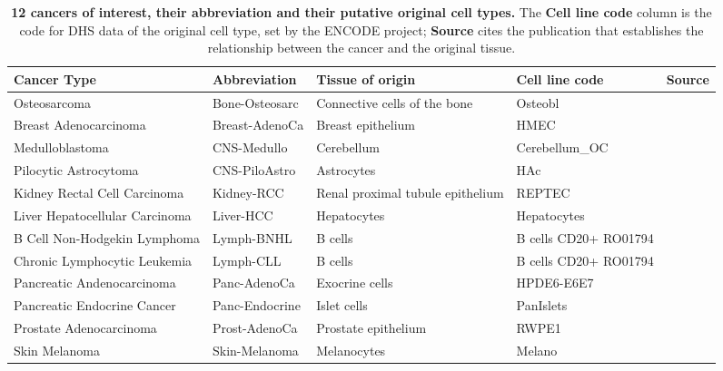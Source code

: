 \begin{table}[hp!]
\centering
\caption{\textbf{12 cancers of interest, their abbreviation and their putative original cell types.} The \textbf{Cell line code} column is the code for DHS data of the original cell type, set by the ENCODE project; \textbf{Source} cites the publication that establishes the relationship between the cancer and the original tissue.}
\label{tab:encode}
\begin{tabulary}{\textwidth}{ LlLLR }
\toprule
\bf{Cancer Type} & \bf{Abbreviation} & \bf{Tissue of origin} & \textbf{Cell line code} & \bf{Source} \\
\toprule
Osteosarcoma & Bone-Osteosarc & Connective cells of the bone & Osteobl & \citet{Alfranca2015BoneDevelopment} \\ \hline

Breast Adenocarcinoma & Breast-AdenoCa & Breast epithelium & HMEC & \citet{Boyce2007BreastCancer} \\ \hline

Medulloblastoma &  CNS-Medullo &  Cerebellum & Cerebellum\_OC & \citet{Penas2015TheMedulloblastoma} \\ \hline

Pilocytic Astrocytoma & CNS-PiloAstro & Astrocytes & HAc & \citet{Collins2015PilocyticMarkers}\\ \hline

Kidney Rectal Cell Carcinoma & Kidney-RCC & Renal proximal tubule epithelium & REPTEC & \citet{Hsieh2017RenalCarcinoma} \\ \hline

Liver Hepatocellular Carcinoma & Liver-HCC & Hepatocytes & Hepatocytes & \citet{Gissen2015StructuralDisease} \\ \hline

B Cell Non-Hodgekin Lymphoma & Lymph-BNHL & B cells & B cells CD20+ RO01794 & \citet{Shankland2012Non-HodgkinLymphoma} \\ \hline

Chronic Lymphocytic Leukemia & Lymph-CLL & B cells & B cells CD20+ RO01794 & \citet{Hallek2018ChronicLeukaemia} \\ \hline

Pancreatic Andenocarcinoma & Panc-AdenoCa & Exocrine cells & HPDE6-E6E7 & \citet{Vareedayah2018PancreaticAdenocarcinoma} \\ \hline

Pancreatic Endocrine Cancer & Panc-Endocrine & Islet cells & PanIslets & \citet{Nakakura2007IsletRegion} \\ \hline

Prostate Adenocarcinoma & Prost-AdenoCa & Prostate epithelium & RWPE1 & \citet{Lee2011OverviewPathology} \\ \hline

Skin Melanoma & Skin-Melanoma & Melanocytes &  Melano & \cite{Lin2007MelanocytePigmentation} \\
\bottomrule

\end{tabulary}
\end{table}

